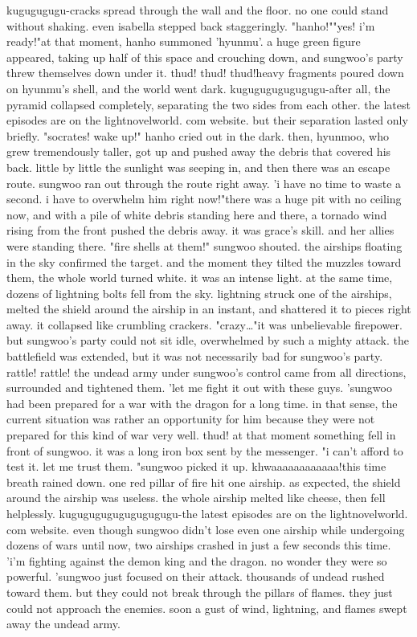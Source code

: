 kugugugugu-cracks spread through the wall and the floor.
 no one could stand without shaking.
 even isabella stepped back staggeringly.
"hanho!""yes! i'm ready!"at that moment, hanho summoned 'hyunmu'.
 a huge green figure appeared, taking up half of this space and crouching down, and sungwoo's party threw themselves down under it.
thud! thud! thud!heavy fragments poured down on hyunmu's shell, and the world went dark.
kugugugugugugugu-after all, the pyramid collapsed completely, separating the two sides from each other.
the latest episodes are on the lightnov­elworld.
com website.
but their separation lasted only briefly.
 "socrates! wake up!" hanho cried out in the dark.
then, hyunmoo, who grew tremendously taller, got up and pushed away the debris that covered his back.
 little by little the sunlight was seeping in, and then there was an escape route.
 sungwoo ran out through the route right away.
'i have no time to waste a second.
 i have to overwhelm him right now!"there was a huge pit with no ceiling now, and with a pile of white debris standing here and there, a tornado wind rising from the front pushed the debris away.
 it was grace's skill.
 and her allies were standing there.
"fire shells at them!" sungwoo shouted.
the airships floating in the sky confirmed the target.
 and the moment they tilted the muzzles toward them, the whole world turned white.
 it was an intense light.
at the same time, dozens of lightning bolts fell from the sky.
lightning struck one of the airships, melted the shield around the airship in an instant, and shattered it to pieces right away.
 it collapsed like crumbling crackers.
"crazy…"it was unbelievable firepower.
 but sungwoo's party could not sit idle, overwhelmed by such a mighty attack.
the battlefield was extended, but it was not necessarily bad for sungwoo's party.
rattle! rattle! the undead army under sungwoo's control came from all directions, surrounded and tightened them.
'let me fight it out with these guys.
'sungwoo had been prepared for a war with the dragon for a long time.
 in that sense, the current situation was rather an opportunity for him because they were not prepared for this kind of war very well.
thud! at that moment something fell in front of sungwoo.
 it was a long iron box sent by the messenger.
"i can't afford to test it.
 let me trust them.
"sungwoo picked it up.
khwaaaaaaaaaaaa!this time breath rained down.
 one red pillar of fire hit one airship.
as expected, the shield around the airship was useless.
 the whole airship melted like cheese, then fell helplessly.
 kugugugugugugugugugu-the latest episodes are on the lightnovelworld.
com website.
even though sungwoo didn't lose even one airship while undergoing dozens of wars until now, two airships crashed in just a few seconds this time.
 'i'm fighting against the demon king and the dragon.
 no wonder they were so powerful.
'sungwoo just focused on their attack.
 thousands of undead rushed toward them.
 but they could not break through the pillars of flames.
 they just could not approach the enemies.
 soon a gust of wind, lightning, and flames swept away the undead army.



